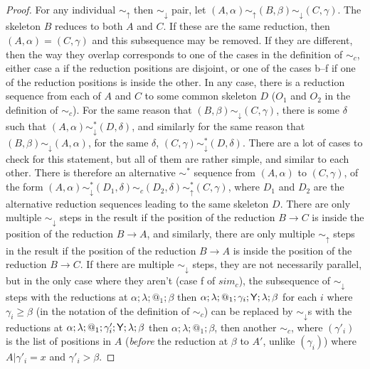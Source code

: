 \begin{proof}
  For any individual $\sim_\uparrow$ then $\sim_\downarrow$ pair, let $(A,\alpha) \sim_\uparrow (B,\beta) \sim_\downarrow (C,\gamma)$. The skeleton $B$ reduces to both $A$ and $C$. If these are the same reduction, then $(A,\alpha) = (C,\gamma)$ and this subsequence may be removed. If they are different, then the way they overlap corresponds to one of the cases in the definition of $\sim_c$, either case a if the reduction positions are disjoint, or one of the cases b--f if one of the reduction positions is inside the other. In any case, there is a reduction sequence from each of $A$ and $C$ to some common skeleton $D$ ($O_1$ and $O_2$ in the definition of $\sim_c$). For the same reason that $(B,\beta) \sim_\downarrow (C,\gamma)$, there is some $\delta$ such that $(A,\alpha) \sim_\downarrow^* (D,\delta)$, and similarly for the same reason that $(B,\beta) \sim_\downarrow (A,\alpha)$, for the same $\delta$, $(C,\gamma) \sim_\downarrow^* (D,\delta)$. There are a lot of cases to check for this statement, but all of them are rather simple, and similar to each other. There is therefore an alternative $\sim^*$ sequence from $(A,\alpha)$ to $(C,\gamma)$, of the form $(A,\alpha) \sim_\downarrow^* (D_1,\delta) \sim_c (D_2,\delta) \sim_\uparrow^* (C,\gamma)$, where $D_1$ and $D_2$ are the alternative reduction sequences leading to the same skeleton $D$. There are only multiple $\sim_\downarrow$ steps in the result if the position of the reduction $B \to C$ is inside the position of the reduction $B \to A$, and similarly, there are only multiple $\sim_\uparrow$ steps in the result if the position of the reduction $B \to A$ is inside the position of the reduction $B \to C$. If there are multiple $\sim_\downarrow$ steps, they are not necessarily parallel, but in the only case where they aren't (case f of $sim_c$), the subsequence of $\sim_\downarrow$ steps with the reductions at $\alpha;\lambda;@_1;\beta$ then $\alpha;\lambda;@_1;\gamma_i;\mathsf{Y};\lambda;\beta$ for each $i$ where $\gamma_i \geq \beta$ (in the notation of the definition of $\sim_c$) can be replaced by $\sim_\downarrow$s with the reductions at $\alpha;\lambda;@_1;\gamma'_i;\mathsf{Y};\lambda;\beta$ then $\alpha;\lambda;@_1;\beta$, then another $\sim_c$, where $(\gamma'_i)$ is the list of positions in $A$ (\emph{before} the reduction at $\beta$ to $A'$, unlike $(\gamma_i)$) where $A | \gamma'_i = x$ and $\gamma'_i > \beta$.


\end{proof}
